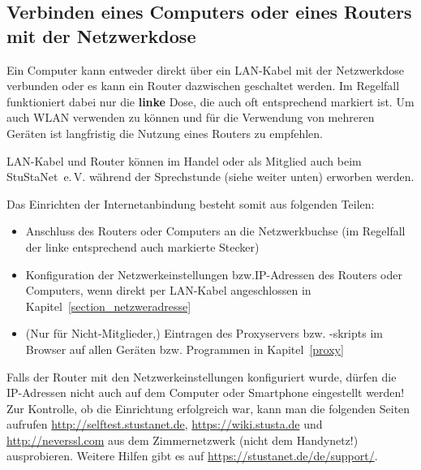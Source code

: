 \documentclass[a4paper,12pt]{scrartcl}
\makeatletter
\newcommand{\StuStaNet}{StuStaNet~e.\,V.\@}
\makeatother
\begin{document}
\subsection{Verbinden eines Computers oder eines Routers mit der Netzwerkdose}
Ein Computer kann entweder direkt über ein LAN-Kabel mit der Netzwerkdose verbunden oder es kann ein Router dazwischen geschaltet werden.
Im Regelfall funktioniert dabei nur die \textbf{linke} Dose, die auch oft entsprechend markiert ist. 
Um auch WLAN verwenden zu können und für die Verwendung von mehreren Geräten ist langfristig die Nutzung eines Routers zu empfehlen.

LAN-Kabel und Router können im Handel oder als Mitglied auch beim \StuStaNet{} während der Sprechstunde (siehe weiter unten) erworben werden.

Das Einrichten der Internetanbindung besteht somit aus folgenden Teilen:
\begin{itemize}
	\item Anschluss des Routers oder Computers an die Netzwerkbuchse (im Regelfall der linke entsprechend auch markierte Stecker)
	\item Konfiguration der Netzwerkeinstellungen bzw.\@ IP-Adressen des Routers oder Computers, wenn direkt per LAN-Kabel angeschlossen in Kapitel~\ref{section_netzweradresse}
	\item (Nur für Nicht-Mitglieder,) Eintragen des Proxyservers bzw. -skripts im Browser auf allen Geräten bzw. Programmen in Kapitel~\ref{proxy}
\end{itemize}
Falls der Router mit den Netzwerkeinstellungen konfiguriert wurde, dürfen die IP-Adressen nicht auch auf dem Computer oder Smartphone eingestellt werden!
Zur Kontrolle, ob die Einrichtung erfolgreich war, kann man die folgenden Seiten aufrufen \mbox{\url{http://selftest.stustanet.de}}, \mbox{\url{https://wiki.stusta.de}} und \mbox{\url{http://neverssl.com}} aus dem Zimmernetzwerk (nicht dem Handynetz!) ausprobieren.
Weitere Hilfen gibt es auf \mbox{\url{https://stustanet.de/de/support/}}.
\end{document}
